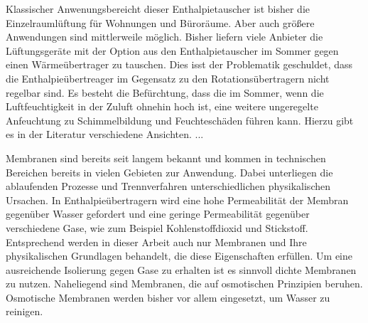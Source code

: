 \documentclass[ 11pt
				,ngerman
				,headsepline
				,headings=small
				,numbers=noenddot %
				,draft=false
				,BCOR=0mm %
				,DIV=12
				,captions=tableheading
				,paper=a4
				,abstracton
                ]{scrreprt}
\begin{document}
\begin{normalsize}
\begin{LARGE}
Klassischer Anwenungsbereicht dieser Enthalpietauscher ist bisher die Einzelraumlüftung für Wohnungen und Büroräume. Aber auch größere Anwendungen sind mittlerweile möglich. Bisher liefern viele Anbieter die Lüftungsgeräte mit der Option aus den Enthalpietauscher im Sommer gegen einen Wärmeübertrager zu tauschen. Dies isst der Problematik geschuldet, dass die Enthalpieübertreager im Gegensatz zu den Rotationsübertragern nicht regelbar sind. Es besteht die Befürchtung, dass die im Sommer, wenn die Luftfeuchtigkeit in der Zuluft ohnehin hoch ist, eine weitere ungeregelte Anfeuchtung zu Schimmelbildung und Feuchteschäden führen kann. Hierzu gibt es in der Literatur verschiedene Ansichten. ...



Membranen sind bereits seit langem bekannt und kommen in technischen Bereichen bereits in vielen Gebieten zur Anwendung. Dabei unterliegen die ablaufenden Prozesse und Trennverfahren unterschiedlichen physikalischen Ursachen. In Enthalpieübertragern wird eine hohe Permeabilität der Membran gegenüber Wasser gefordert und eine geringe Permeabilität gegenüber verschiedene Gase, wie zum Beispiel Kohlenstoffdioxid und Stickstoff. Entsprechend werden in dieser Arbeit auch nur Membranen und Ihre physikalischen Grundlagen behandelt, die diese Eigenschaften erfüllen. Um eine ausreichende Isolierung gegen Gase zu erhalten ist es sinnvoll dichte Membranen zu nutzen. Naheliegend sind Membranen, die auf osmotischen Prinzipien beruhen. Osmotische Membranen werden bisher vor allem eingesetzt, um Wasser zu reinigen. 

 
\end{LARGE}
\end{normalsize}
\end{document}
